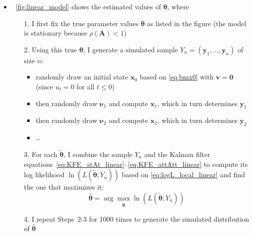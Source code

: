 \documentclass[12pt,a4paper]{article}
\begin{document}
\begin{itemize}
\begin{itemize}
\item \figurename~\ref{fig:linear_model} shows the estimated values of $\bm{\theta}$, where
  \begin{itemize}
  \item[1.] I first fix the true parameter values $\bm{\theta}$ as listed in the figure
    (the model is stationary because $\rho(\bm{A}) < 1$)
  \item[2.] Using this true $\bm{\theta}$, I generate a simulated sample $Y_{n}=(\bm{y}_{1},\ldots, \bm{y}_{n})$ of size $n$:
    \begin{itemize}
    \item randomly draw an initial state $\bm{x}_{0}$ based on \eqref{eq:bmx0} with $\bm{v}=\bm{0}$ (since $u_{t}=0$ for all $t\leq 0$)
    \item then randomly draw $\bm{\nu}_{1}$ and compute $\bm{x}_{1}$, which in turn determines $\bm{y}_{1}$
    \item then randomly draw $\bm{\nu}_{2}$ and compute $\bm{x}_{2}$, which in turn determines $\bm{y}_{2}$
    \item \ldots
    \end{itemize}
  \item[3.] For each $\tilde{\bm{\theta}}$, I combine the sample $Y_{n}$ and the Kalman filter equations~\eqref{eq:KFE_atAt_linear}--\eqref{eq:KFE_attAtt_linear}
    to compute its log likelihood $\ln(L(\tilde{\bm{\theta}};Y_{n}))$ based on \eqref{eq:logL_local_linear}
    and find the one that maximizes it:
    \begin{equation}\nonumber%
      \hat{\bm{\theta}} = \arg\max_{\tilde{\bm{\theta}}} \ln(L(\tilde{\bm{\theta}};Y_{n})) 
    \end{equation}
  \item[4.] I repeat Steps~2-3 for 1000 times to generate the simulated distribution of $\hat{\bm{\theta}}$
  \end{itemize}
    
  \end{itemize}

\end{itemize}
\end{document}
